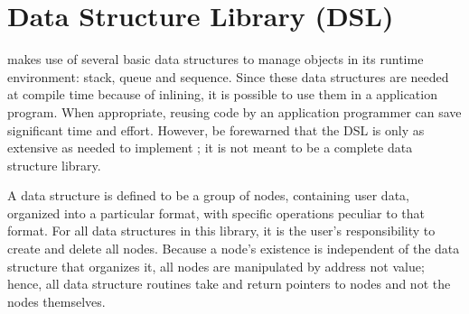 \documentclass[openright,twoside]{report}
\begin{document}
\chapter{Data Structure Library (DSL)}
\label{s:DataStructureLibrary}
%

\uC makes use of several basic data structures to manage objects in its runtime environment: stack, queue and sequence.
Since these data structures are needed at compile time because of inlining, it is possible to use them in a \uC application program.
When appropriate, reusing code by an application programmer can save significant time and effort.
However, be forewarned that the \uC DSL is only as extensive as needed to implement \uC;
it is not meant to be a complete data structure library.

A data structure is defined to be a group of nodes, containing user data, organized into a particular format, with specific operations peculiar to that format.
For all data structures in this library, it is the user's responsibility to create and delete all nodes.
Because a node's existence is independent of the data structure that organizes it, all nodes are manipulated by address not value;
hence, all data structure routines take and return pointers to nodes and not the nodes themselves.
\end{document}
